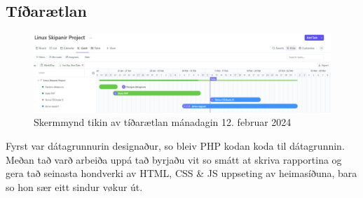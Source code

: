 \documentclass{article}
\begin{document}
\subsection{Tíðarætlan}
\begin{figure}[H]
    \includegraphics[width=\linewidth]{tíðarætlan.png}
    \caption{Skermmynd tikin av tíðarætlan mánadagin 12. februar 2024}
    \label{fig:tíðarætlan.png}
\end{figure}

\par Fyrst var dátagrunnurin designaður, so bleiv PHP kodan koda til dátagrunnin.
Meðan tað varð arbeiða uppá tað byrjaðu vit so smátt at skriva rapportina og gera tað
seinasta hondverki av HTML, CSS \& JS uppseting av heimasíðuna, bara so hon sær eitt sindur
vøkur út.


{}


{}


{}


{}

\end{document}
